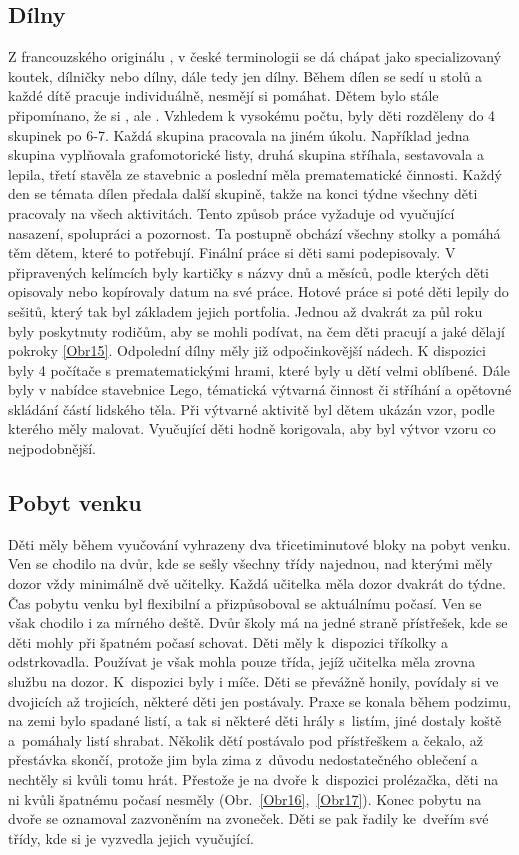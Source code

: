 		\subsection{Dílny}
		\label{dilny}
			Z francouzského originálu , v české terminologii se dá chápat jako specializovaný koutek, dílničky nebo dílny, dále tedy jen dílny. 
			Během dílen se sedí u stolů a každé dítě pracuje individuálně, nesmějí si pomáhat. Dětem bylo stále připomínano, že si , ale . Vzhledem k vysokému počtu, byly děti rozděleny do 4 skupinek po 6-7. Každá skupina pracovala na jiném úkolu. Například jedna skupina vyplňovala grafomotorické listy, druhá skupina stříhala, sestavovala a lepila, třetí stavěla ze stavebnic a poslední měla prematematické činnosti. Každý den se témata dílen předala další skupině, takže na konci týdne všechny děti pracovaly na všech aktivitách. Tento způsob práce vyžaduje od vyučující nasazení, spolupráci a pozornost. Ta postupně obchází všechny stolky a pomáhá těm dětem, které to potřebují. Finální práce si děti sami podepisovaly. V připravených kelímcích byly kartičky s názvy dnů a měsíců, podle kterých děti opisovaly nebo kopírovaly datum na své práce. Hotové práce si poté děti lepily do sešitů, který tak byl základem jejich portfolia. Jednou až dvakrát za půl roku byly poskytnuty rodičům, aby se mohli podívat, na čem děti pracují a jaké dělají pokroky \ref{Obr15}. Odpolední dílny měly již odpočinkovější nádech. K dispozici byly 4 počítače s prematematickými hrami, které byly u dětí velmi oblíbené. Dále byly v nabídce stavebnice Lego, tématická výtvarná činnost či stříhání a opětovné skládání částí lidského těla. Při výtvarné aktivitě byl dětem ukázán vzor, podle kterého měly malovat. Vyučující děti hodně korigovala, aby byl výtvor vzoru co nejpodobnější.


		\subsection{Pobyt venku}
		\label{prestavka}
			Děti měly během vyučování vyhrazeny dva třicetiminutové bloky na pobyt venku. Ven se chodilo na dvůr, kde se sešly všechny třídy najednou, nad kterými měly dozor vždy minimálně dvě učitelky. Každá učitelka měla dozor dvakrát do týdne. Čas pobytu venku byl flexibilní a přizpůsoboval se aktuálnímu počasí. Ven se však chodilo i za mírného deště. Dvůr školy má na jedné straně přístřešek, kde se děti mohly při špatném počasí schovat. Děti měly k dispozici tříkolky a odstrkovadla. Používat je však mohla pouze třída, jejíž učitelka měla zrovna službu na dozor. K dispozici byly i míče. Děti se převážně honily, povídaly si ve dvojicích až trojicích, některé děti jen postávaly. Praxe se konala během podzimu, na zemi bylo spadané listí, a tak si některé děti hrály s listím, jiné dostaly koště a pomáhaly listí shrabat. Několik dětí postávalo pod přístřeškem a čekalo, až přestávka skončí, protože jim byla zima z důvodu nedostatečného oblečení a nechtěly si kvůli tomu hrát. Přestože je na dvoře k dispozici prolézačka, děti na ni kvůli špatnému počasí nesměly (Obr.~\ref{Obr16},~\ref{Obr17}). 
			Konec pobytu na dvoře se oznamoval zazvoněním na zvoneček. Děti se pak řadily ke dveřím své třídy, kde si je vyzvedla jejich vyučující. 

